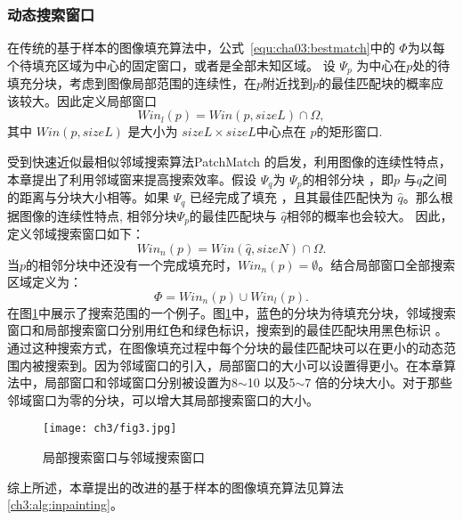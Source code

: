  \subsubsection{动态搜索窗口}
 \label{sec:subsub:dynamicSearch}
 在传统的基于样本的图像填充算法中，公式~\ref{equ:cha03:bestmatch}中的 \(\Phi\)为以每个待填充区域为中心的固定窗口\cite{LeMeur_2011}，或者是全部未知区域\cite{Criminisi04regionfilling}。 设 \(\Psi_p\) 为中心在\(p\)处的待填充分块，考虑到图像局部范围的连续性，在\(p\)附近找到\(p\)的最佳匹配块的概率应该较大。因此定义局部窗口
 $$Win_l(p)=Win(p,sizeL)\cap \Omega,$$
 其中 \(Win(p,sizeL)\) 是大小为 \(sizeL\times sizeL\)中心点在 \( p\)的矩形窗口. \par
受到快速近似最相似邻域搜索算法PatchMatch \cite{Barnes:2009}的启发，利用图像的连续性特点，本章提出了利用邻域窗来提高搜索效率。假设 \(\Psi_q\)为 \(\Psi_p\)的相邻分块 ，即\(p\) 与\(q\)之间的距离与分块大小相等。如果 \(\Psi_q\) 已经完成了填充 ，且其最佳匹配快为 \(\hat{q}\)。那么根据图像的连续性特点,  相邻分块\(\Psi_p\)的最佳匹配块与 \(\hat{q}\)相邻的概率也会较大。 因此，定义邻域搜索窗口如下：
 $$Win_n(p)=Win(\hat{q},sizeN)\cap\Omega.$$
 当\(p\)的相邻分块中还没有一个完成填充时，\( Win_n(p)=\emptyset  \)。结合局部窗口全部搜索区域定义为：
 $$\Phi=Win_n(p)\cup Win_l(p).$$
 在图\ref{ch3:fig:3}中展示了搜索范围的一个例子。图\ref{ch3:fig:3}中，蓝色的分块为待填充分块，邻域搜索窗口和局部搜索窗口分别用红色和绿色标识，搜索到的最佳匹配块用黑色标识 。通过这种搜索方式，在图像填充过程中每个分块的最佳匹配块可以在更小的动态范围内被搜索到。因为邻域窗口的引入，局部窗口的大小可以设置得更小。在本章算法中，局部窗口和邻域窗口分别被设置为8\(\sim\)10 以及5\(\sim\)7 倍的分块大小。对于那些邻域窗口为零的分块，可以增大其局部搜索窗口的大小。\par
 \begin{figure}[!htbp]
 	\begin{center}
 			\texttt{[image: ch3/fig3.jpg]}
 	\end{center}
     \caption{局部搜索窗口与邻域搜索窗口}
 	\label{ch3:fig:3}
 \end{figure}
 综上所述，本章提出的改进的基于样本的图像填充算法见算法\ref{ch3:alg:inpainting}。
 \renewcommand{\algorithmcfname}{算法}
